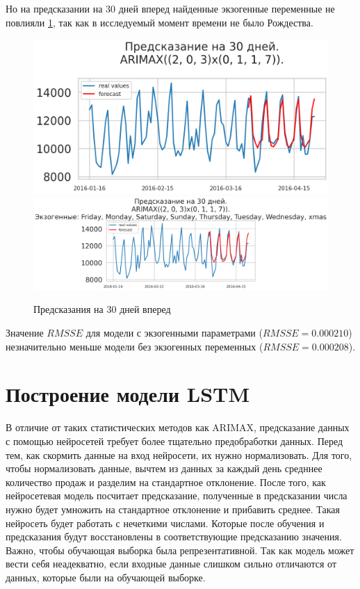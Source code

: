 Но на предсказании на 30 дней вперед найденные экзогенные переменные не повлияли \ref{img:arimax_forecast},
так как в исследуемый момент времени не было Рождества.

\def\figurename{Рис}
\begin{figure}[t]
	\centering
	\includegraphics[width=0.9\columnwidth]{./img/arimax_simple_pred30.png}
	\includegraphics[width=0.9\columnwidth]{./img/arimax_with_exog_pred30.png}
	\caption{Предсказания на 30 дней вперед}
	\label{img:arimax_forecast}
\end{figure}

Значение $ RMSSE $ для модели с экзогенными параметрами ($ RMSSE = 0.000210 $) незначительно меньше
модели без экзогенных переменных ($ RMSSE = 0.000208 $).


\section{Построение модели LSTM}

В отличие от таких статистических методов как ARIMAX, предсказание данных
с помощью нейросетей требует более тщательно предобработки данных.
Перед тем, как скормить данные на вход нейросети, их нужно нормализовать.
Для того, чтобы нормализовать данные, вычтем из данных за каждый день средннее
количество продаж и разделим на стандартное отклонение. После того, как
нейросетевая модель посчитает предсказание, полученные в предсказании
числа нужно будет умножить на стандартное отклонение и прибавить среднее.
Такая нейросеть будет работать с нечеткими числами. Которые после обучения
и предсказания будут восстановлены в соответствующие предсказанию значения.
Важно, чтобы обучающая выборка была репрезентативной. Так как модель
может вести себя неадекватно, если входные данные слишком сильно отличаются
от данных, которые были на обучающей выборке.

